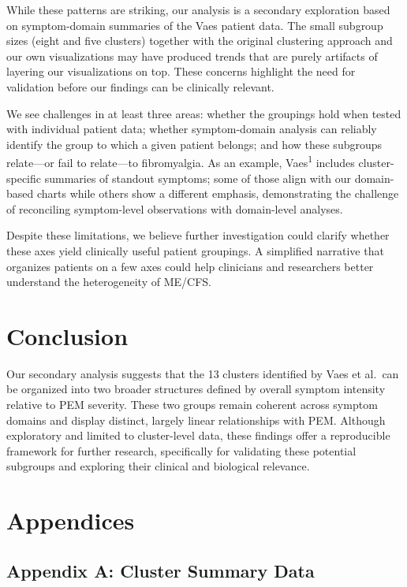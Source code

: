 \documentclass[
  letterpaper,
  DIV=11,
  numbers=noendperiod]{scrartcl}
\begin{document}
While these patterns are striking, our analysis is a secondary
exploration based on symptom-domain summaries of the Vaes patient data.
The small subgroup sizes (eight and five clusters) together with the
original clustering approach and our own visualizations may have
produced trends that are purely artifacts of layering our visualizations
on top. These concerns highlight the need for validation before our
findings can be clinically relevant.

We see challenges in at least three areas: whether the groupings hold
when tested with individual patient data; whether symptom-domain
analysis can reliably identify the group to which a given patient
belongs; and how these subgroups relate---or fail to relate---to
fibromyalgia. As an example, Vaes\textsuperscript{1} includes
cluster-specific summaries of standout symptoms; some of those align
with our domain-based charts while others show a different emphasis,
demonstrating the challenge of reconciling symptom-level observations
with domain-level analyses.

Despite these limitations, we believe further investigation could
clarify whether these axes yield clinically useful patient groupings. A
simplified narrative that organizes patients on a few axes could help
clinicians and researchers better understand the heterogeneity of
ME/CFS.

\section{Conclusion}\label{conclusion}

Our secondary analysis suggests that the 13 clusters identified by Vaes
et al.~can be organized into two broader structures defined by overall
symptom intensity relative to PEM severity. These two groups remain
coherent across symptom domains and display distinct, largely linear
relationships with PEM. Although exploratory and limited to
cluster-level data, these findings offer a reproducible framework for
further research, specifically for validating these potential subgroups
and exploring their clinical and biological relevance.

\clearpage

\section{Appendices}\label{appendices}

\FloatBarrier

\subsection*{Appendix A: Cluster Summary Data}\label{sec-cluster-data}
\end{document}
